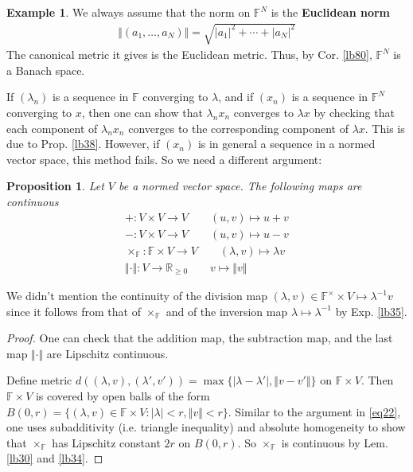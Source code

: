 \documentclass[12pt,b5paper,notitlepage]{article}
\theoremstyle{definition}
\newtheorem{eg}[df]{Example}
\theoremstyle{plain}
\newtheorem{pp}[df]{Proposition}
\newcommand{\Rbb}{\mathbb R}
\newcommand{\Fbb}{\mathbb F}
\numberwithin{equation}{section}
\begin{document}
\begin{eg}
We always assume that the norm on $\Fbb^N$ is the \textbf{Euclidean norm} 
\begin{align}
\Vert (a_1,\dots,a_N)\Vert=\sqrt{|a_1|^2+\cdots+|a_N|^2}
\end{align}
The canonical metric it gives is the Euclidean metric. Thus, by Cor. \ref{lb80}, $\Fbb^N$ is a Banach space.
\end{eg}



If $(\lambda_n)$ is a sequence in $\Fbb$ converging to $\lambda$, and if $(x_n)$ is a sequence in $\Fbb^N$ converging to $x$, then one can show that $\lambda_nx_n$ converges to $\lambda x$ by checking that each component of $\lambda_nx_n$ converges to the corresponding component of $\lambda x$. This is due to Prop. \ref{lb38}. However, if $(x_n)$ is in general a sequence in a normed vector space, this method fails. So we need a different argument:

\begin{pp}\label{lb82}
Let $V$ be a normed vector space. The following maps are continuous
\begin{gather*}
+: V\times V\rightarrow V\qquad (u,v)\mapsto u+v\\
-: V\times V\rightarrow V\qquad (u,v)\mapsto u-v\\
\times_\Fbb: \Fbb\times V\rightarrow V\qquad (\lambda,v)\mapsto \lambda v\\
\Vert\cdot\Vert:V\rightarrow\Rbb_{\geq 0}\qquad v\mapsto \Vert v\Vert
\end{gather*}
\end{pp}

We didn't mention the continuity of the division map $(\lambda,v)\in\Fbb^\times\times V\mapsto\lambda^{-1}v$ since it follows from that of $\times_\Fbb$ and of the inversion map $\lambda\mapsto\lambda^{-1}$ by Exp. \ref{lb35}.

\begin{proof}
One can check that the addition map, the subtraction map, and the last map $\Vert\cdot\Vert$ are Lipschitz continuous. 

Define metric $d((\lambda,v),(\lambda',v'))=\max\{|\lambda-\lambda'|,\Vert v-v'\Vert \}$ on $\Fbb\times V$. Then $\Fbb\times V$ is covered by open balls of the form $B(0,r)=\{(\lambda,v)\in\Fbb\times V:|\lambda|<r,\Vert v\Vert<r\}$. Similar to the argument in \eqref{eq22}, one uses subadditivity (i.e. triangle inequality) and absolute homogeneity to show that $\times_\Fbb$ has Lipschitz constant $2r$ on $B(0,r)$. So $\times_\Fbb$ is continuous by Lem. \ref{lb30} and \ref{lb34}.
\end{proof}
\end{document}
